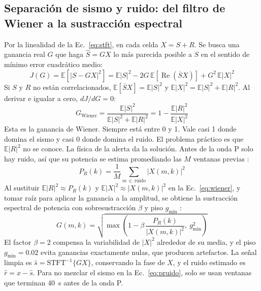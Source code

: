 \documentclass[11pt,letterpaper]{article}
\begin{document}
\subsection{Separación de sismo y ruido: del filtro de Wiener a la sustracción espectral}
Por la linealidad de la Ec.~\eqref{eq:stft}, en cada celda $X = S + R$. Se busca una ganancia real $G$ que haga $\hat S = G X$ lo más parecida posible a $S$ en el sentido de mínimo error cuadrático medio:
\begin{equation}
J(G) = \mathbb E\left[|S - GX|^2\right] = \mathbb E|S|^2 - 2G\,\mathbb E[\operatorname{Re}(\overline S X)] + G^2\,\mathbb E|X|^2
\label{eq:J}
\end{equation}
Si $S$ y $R$ no están correlacionados, $\mathbb E[\overline S X] = \mathbb E|S|^2$ y $\mathbb E|X|^2 = \mathbb E|S|^2 + \mathbb E|R|^2$. Al derivar e igualar a cero, $dJ/dG = 0$:
\begin{equation}
G_{\text{Wiener}} = \frac{\mathbb E|S|^2}{\mathbb E|S|^2 + \mathbb E|R|^2} = 1 - \frac{\mathbb E|R|^2}{\mathbb E|X|^2}
\label{eq:wiener}
\end{equation}
Esta es la ganancia de Wiener. Siempre está entre 0 y 1. Vale casi 1 donde domina el sismo y casi 0 donde domina el ruido. El problema práctico es que $\mathbb E|R|^2$ no se conoce. La física de la alerta da la solución. Antes de la onda P solo hay ruido, así que su potencia se estima promediando las $M$ ventanas previas \parencite{boll1979,mousavi2016}:
\begin{equation}
P_R(k) = \frac{1}{M}\sum_{m\,\in\,\text{ruido}}|X(m,k)|^2
\label{eq:pruido}
\end{equation}
Al sustituir $\mathbb E|R|^2 \approx P_R(k)$ y $\mathbb E|X|^2 \approx |X(m,k)|^2$ en la Ec.~\eqref{eq:wiener}, y tomar raíz para aplicar la ganancia a la amplitud, se obtiene la sustracción espectral de potencia con sobresustracción $\beta$ y piso $g_{\min}$ \parencite{berouti1979}:
\begin{equation}
G(m,k) = \sqrt{\max\!\left(1 - \beta\,\frac{P_R(k)}{|X(m,k)|^2},\ g_{\min}^2\right)}
\label{eq:ganancia}
\end{equation}
El factor $\beta = 2$ compensa la variabilidad de $|X|^2$ alrededor de su media, y el piso $g_{\min} = 0.02$ evita ganancias exactamente nulas, que producen artefactos. La señal limpia es $\hat s = \text{STFT}^{-1}\{G X\}$, conservando la fase de $X$, y el ruido estimado es $\hat r = x - \hat s$. Para no mezclar el sismo en la Ec.~\eqref{eq:pruido}, solo se usan ventanas que terminan \SI{40}{s} antes de la onda P.
\end{document}
